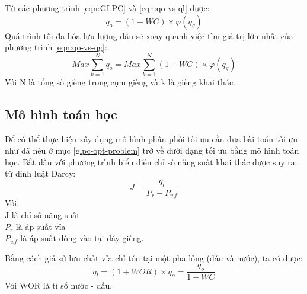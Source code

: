 \documentclass[12pt,a4paper]{report}
\begin{document}
Từ các phương trình \ref{eqn:GLPC} và \ref{eqn:qo-vs-ql} được:
	\begin{equation}\label{eqn:qo-vs-qg}
		q_o = (1 - WC) \times \varphi(q_g)
	\end{equation}
Quá trình tối đa hóa lưu lượng dầu sẽ xoay quanh việc tìm giá trị lớn nhất của phương trình \ref{eqn:qo-vs-qg}:
	\begin{equation}\label{eqn:max-qo}
		Max\sum_{k=1}^Nq_o = Max\sum_{k=1}^N(1 - WC) \times \varphi(q_g)
	\end{equation}
Với N là tổng số giếng trong cụm giếng và k là giếng khai thác.\\

\subsection{Mô hình toán học}
Để có thể thực hiện xây dụng mô hình phân phối tối ưu cần đưa bài toán tối ưu như đã nêu ở mục \ref{glpc-opt-problem} trở về dưới dạng tối ưu bằng mô hình toán học. Bắt đầu với phương trình biểu diễn chỉ số năng suất khai thác được suy ra từ định luật Darcy:
	\begin{equation}\label{eqn:darcy-productivity-index}
		J = \dfrac{q_l}{P_r - P_{wf}}
	\end{equation}
Với:\\
\hspace*{1cm}J là chỉ số năng suất\\
\hspace*{1cm}$P_r$ là áp suất vỉa\\
\hspace*{1cm}$P_{wf}$ là áp suất dòng vào tại đáy giếng.

Bằng cách giả sử lưu chất vỉa chỉ tồn tại một pha lỏng (dầu và nước), ta có được:
	\begin{equation}\label{eqn:qo-ql-wc}
		q_l = (1 + WOR) \times q_o = \dfrac{q_o}{1 - WC}
	\end{equation}
Với WOR là tỉ số nước - dầu.
\end{document}
